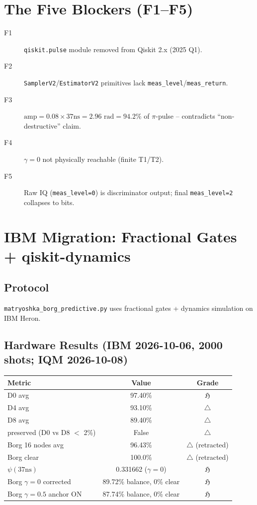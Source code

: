 \documentclass[11pt,a4paper]{article}
\begin{document}
\section{The Five Blockers (F1--F5)}

\begin{description}
\item[F1] \texttt{qiskit.pulse} module removed from Qiskit 2.x (2025 Q1).
\item[F2] \texttt{SamplerV2}/\texttt{EstimatorV2} primitives lack \texttt{meas\_level}/\texttt{meas\_return}.
\item[F3] $\text{amp}=0.08 \times 37\text{ns} = 2.96\text{ rad} = 94.2\%$ of $\pi$-pulse -- contradicts ``non-destructive'' claim.
\item[F4] $\gamma=0$ not physically reachable (finite T1/T2).
\item[F5] Raw IQ (\texttt{meas\_level=0}) is discriminator output; final \texttt{meas\_level=2} collapses to bits.
\end{description}

\section{IBM Migration: Fractional Gates + qiskit-dynamics}

\subsection{Protocol}
\texttt{matryoshka\_borg\_predictive.py} uses fractional gates + dynamics simulation on IBM Heron.

\subsection{Hardware Results (IBM 2026-10-06, 2000 shots; IQM 2026-10-08)}

\begin{table}[h]
\centering
\begin{tabular}{lcc}
\toprule
Metric & Value & Grade \\
\midrule
D0 avg & 97.40\% & $\mathfrak{H}$ \\
D4 avg & 93.10\% & $\triangle$ \\
D8 avg & 89.40\% & $\triangle$ \\
preserved (D0 vs D8 $<$ 2\%) & False & $\triangle$ \\
Borg 16 nodes avg & 96.43\% & $\triangle$ (retracted) \\
Borg clear & 100.0\% & $\triangle$ (retracted) \\
$\psi(37\text{ns})$ & 0.331662 ($\gamma=0$) & $\mathfrak{H}$ \\
\midrule
Borg $\gamma=0$ corrected & 89.72\% balance, 0\% clear & $\mathfrak{H}$ \\
Borg $\gamma=0.5$ anchor ON & 87.74\% balance, 0\% clear & $\mathfrak{H}$ \\
\bottomrule
\end{tabular}
\end{table}
\end{document}

